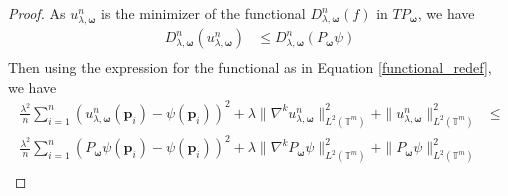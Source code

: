 \documentclass[multixcb]{amstext-l}
\theoremstyle{plain}
\theoremstyle{definition}
\theoremstyle{definition}
\theoremstyle{remark}
\numberwithin{equation}{chapter}
\begin{document}
\begin{proof}
As $u_{\lambda,\boldsymbol{\omega}}^n$ is the minimizer of the functional $D^n_{\lambda,\boldsymbol{\omega}}(f)$ in $TP_{\boldsymbol{\omega}}$, we have 
\begin{equation}\label{eqap3}
\begin{aligned}
D^n_{\lambda,\boldsymbol{\omega}}(u_{\lambda,\boldsymbol{\omega}}^n) &\le D^n_{\lambda,\boldsymbol{\omega}}(P_{\boldsymbol{\omega}}\psi) \\
\end{aligned}
\end{equation}
Then using the expression for the functional as in Equation \ref{functional_redef}, we have
\begin{equation}\label{eqap}
\begin{aligned}
  \frac{\lambda^2}{n}\sum\limits_{i=1}^{n}(u_{\lambda,\boldsymbol{\omega}}^n(\boldsymbol{p}_i)-\psi(\boldsymbol{p}_i))^2 + \lambda\|\nabla^ku_{\lambda,\boldsymbol{\omega}}^n\|_{L^2(\mathbb{T}^m)}^2 + \|u_{\lambda,\boldsymbol{\omega}}^n\|_{L^2(\mathbb{T}^m)}^2 &\le \\ \frac{\lambda^2}{n}\sum\limits_{i=1}^{n}(P_{\boldsymbol{\omega}}\psi(\boldsymbol{p}_i)-\psi(\boldsymbol{p}_i))^2 + \lambda\|\nabla^kP_{\boldsymbol{\omega}}\psi\|_{L^2(\mathbb{T}^m)}^2 + \|P_{\boldsymbol{\omega}}\psi\|_{L^2(\mathbb{T}^m)}^2
\\
\end{aligned}
\end{equation}


\end{proof}
\end{document}
